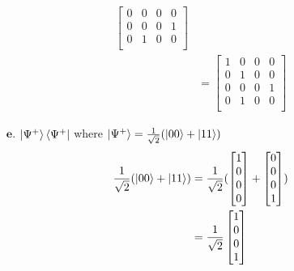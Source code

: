 \documentclass[11pt]{article}
\def\srtt{\ensuremath\frac{1}{\sqrt{2}}}
\begin{document}
\begin{enumerate}
\begin{align*}
\begin{bmatrix}
                0 & 0 & 0 & 0 \\
                0 & 0 & 0 & 1 \\
                0 & 1 & 0 & 0 \\
            \end{bmatrix} \\
        &= \begin{bmatrix}
                1 & 0 & 0 & 0 \\
                0 & 1 & 0 & 0 \\
                0 & 0 & 0 & 1 \\
                0 & 1 & 0 & 0 \\
            \end{bmatrix}
    \end{align*}

    \item[$\textbf{e.}$] $\ket{\Psi^+}\bra{\Psi^+}$ where 
        $\ket{\Psi^+} = \srtt(\ket{00} + \ket{11})$
    \begin{align*}
        \srtt(\ket{00} + \ket{11}) 
        &= \srtt(\begin{bmatrix}1\\0\\0\\0\end{bmatrix}+\begin{bmatrix}0\\0\\0\\1\end{bmatrix}) \\
        &= \srtt\begin{bmatrix}1\\0\\0\\1\end{bmatrix}
    \end{align*}


\end{enumerate}
\end{document}
